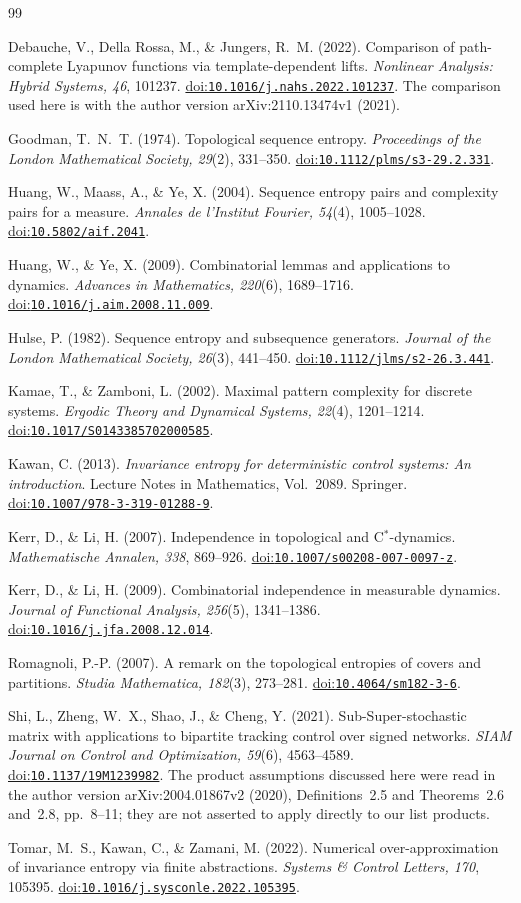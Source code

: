 \documentclass[11pt,reqno]{amsart}
\numberwithin{equation}{section}
\theoremstyle{definition}
\newcommand{\doi}[1]{\href{https://doi.org/#1}{doi:\nolinkurl{#1}}}
\begin{document}
\begin{thebibliography}{99}

Debauche, V., Della Rossa, M., \& Jungers, R.~M. (2022).
Comparison of path-complete Lyapunov functions via template-dependent lifts.
\emph{Nonlinear Analysis: Hybrid Systems, 46}, 101237.
\doi{10.1016/j.nahs.2022.101237}.
The comparison used here is with the author version
arXiv:2110.13474v1 (2021).

Goodman, T.~N.~T. (1974). Topological sequence entropy.
\emph{Proceedings of the London Mathematical Society, 29}(2), 331--350.
\doi{10.1112/plms/s3-29.2.331}.

Huang, W., Maass, A., \& Ye, X. (2004).
Sequence entropy pairs and complexity pairs for a measure.
\emph{Annales de l'Institut Fourier, 54}(4), 1005--1028.
\doi{10.5802/aif.2041}.

Huang, W., \& Ye, X. (2009).
Combinatorial lemmas and applications to dynamics.
\emph{Advances in Mathematics, 220}(6), 1689--1716.
\doi{10.1016/j.aim.2008.11.009}.

Hulse, P. (1982). Sequence entropy and subsequence generators.
\emph{Journal of the London Mathematical Society, 26}(3), 441--450.
\doi{10.1112/jlms/s2-26.3.441}.

Kamae, T., \& Zamboni, L. (2002).
Maximal pattern complexity for discrete systems.
\emph{Ergodic Theory and Dynamical Systems, 22}(4), 1201--1214.
\doi{10.1017/S0143385702000585}.

Kawan, C. (2013).
\emph{Invariance entropy for deterministic control systems:
An introduction}. Lecture Notes in Mathematics, Vol.~2089.
Springer. \doi{10.1007/978-3-319-01288-9}.

Kerr, D., \& Li, H. (2007).
Independence in topological and C$^*$-dynamics.
\emph{Mathematische Annalen, 338}, 869--926.
\doi{10.1007/s00208-007-0097-z}.

Kerr, D., \& Li, H. (2009).
Combinatorial independence in measurable dynamics.
\emph{Journal of Functional Analysis, 256}(5), 1341--1386.
\doi{10.1016/j.jfa.2008.12.014}.

Romagnoli, P.-P. (2007).
A remark on the topological entropies of covers and partitions.
\emph{Studia Mathematica, 182}(3), 273--281.
\doi{10.4064/sm182-3-6}.

Shi, L., Zheng, W.~X., Shao, J., \& Cheng, Y. (2021).
Sub-Super-stochastic matrix with applications to bipartite tracking
control over signed networks.
\emph{SIAM Journal on Control and Optimization, 59}(6), 4563--4589.
\doi{10.1137/19M1239982}.
The product assumptions discussed here were read in the author version
arXiv:2004.01867v2 (2020), Definitions~2.5 and Theorems~2.6 and~2.8,
pp.~8--11; they are not asserted to apply directly to our list products.

Tomar, M.~S., Kawan, C., \& Zamani, M. (2022).
Numerical over-approximation of invariance entropy via finite abstractions.
\emph{Systems \& Control Letters, 170}, 105395.
\doi{10.1016/j.sysconle.2022.105395}.

\end{thebibliography}
\end{document}

